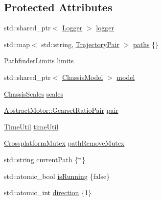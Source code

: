 \subsection*{Protected Attributes}
\begin{DoxyCompactItemize}
\item 
std\+::shared\+\_\+ptr$<$ \mbox{\hyperlink{classokapi_1_1Logger}{Logger}} $>$ \mbox{\hyperlink{classokapi_1_1AsyncMotionProfileController_a3ee7290ff00e7e10f381a9d166f5e5f9}{logger}}
\item 
std\+::map$<$ std\+::string, \mbox{\hyperlink{structokapi_1_1AsyncMotionProfileController_1_1TrajectoryPair}{Trajectory\+Pair}} $>$ \mbox{\hyperlink{classokapi_1_1AsyncMotionProfileController_a2aa4ab02d2ef7cf29d6e6a952b3c4d9e}{paths}} \{\}
\item 
\mbox{\hyperlink{structokapi_1_1PathfinderLimits}{Pathfinder\+Limits}} \mbox{\hyperlink{classokapi_1_1AsyncMotionProfileController_a2278da257c608adfcf52b0e3b1b7802b}{limits}}
\item 
std\+::shared\+\_\+ptr$<$ \mbox{\hyperlink{classokapi_1_1ChassisModel}{Chassis\+Model}} $>$ \mbox{\hyperlink{classokapi_1_1AsyncMotionProfileController_afee259f3912a0d57620f9fd422b880c3}{model}}
\item 
\mbox{\hyperlink{classokapi_1_1ChassisScales}{Chassis\+Scales}} \mbox{\hyperlink{classokapi_1_1AsyncMotionProfileController_aad6f433eebbc0f7dff98cd3f258981a4}{scales}}
\item 
\mbox{\hyperlink{structokapi_1_1AbstractMotor_1_1GearsetRatioPair}{Abstract\+Motor\+::\+Gearset\+Ratio\+Pair}} \mbox{\hyperlink{classokapi_1_1AsyncMotionProfileController_a89073eb9854629c18558842f14af5cf0}{pair}}
\item 
\mbox{\hyperlink{classokapi_1_1TimeUtil}{Time\+Util}} \mbox{\hyperlink{classokapi_1_1AsyncMotionProfileController_a82610b4101b963cbd314e6c287be4ec4}{time\+Util}}
\item 
\mbox{\hyperlink{classCrossplatformMutex}{Crossplatform\+Mutex}} \mbox{\hyperlink{classokapi_1_1AsyncMotionProfileController_ad3f504521a49ce164e7e8465e66899c1}{path\+Remove\+Mutex}}
\item 
std\+::string \mbox{\hyperlink{classokapi_1_1AsyncMotionProfileController_a3d2962ff85f036b10e19eb90083572be}{current\+Path}} \{\char`\"{}\char`\"{}\}
\item 
std\+::atomic\+\_\+bool \mbox{\hyperlink{classokapi_1_1AsyncMotionProfileController_a597827de59250b56093a13e39a16d02d}{is\+Running}} \{false\}
\item 
std\+::atomic\+\_\+int \mbox{\hyperlink{classokapi_1_1AsyncMotionProfileController_a7fc07f6d257d934fea7b40b18ab112cb}{direction}} \{1\}

\end{DoxyCompactItemize}
